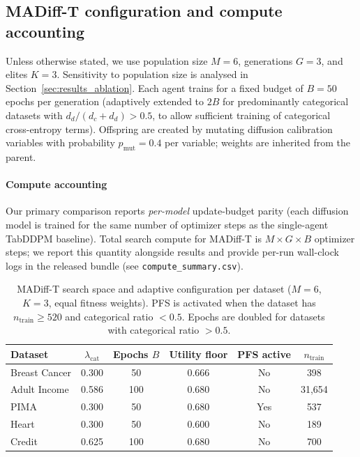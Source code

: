 \documentclass[preprint,12pt]{elsarticle}
\begin{document}
\subsection{MADiff-T configuration and compute accounting}
Unless otherwise stated, we use population size $M=6$, generations 
$G=3$, and elites $K=3$. Sensitivity to population size is 
analysed in Section~\ref{sec:results_ablation}. Each agent trains for a fixed budget of $B=50$ epochs per generation (adaptively extended to $2B$ for predominantly categorical datasets with $d_d/(d_c+d_d) > 0.5$, to allow sufficient training of categorical cross-entropy terms). Offspring are created by mutating diffusion calibration variables with probability $p_{\text{mut}}=0.4$ per variable; weights are inherited from the parent.

\paragraph{Compute accounting} Our primary comparison reports \emph{per-model} update-budget parity (each diffusion model is trained for the same number of optimizer steps as the single-agent TabDDPM baseline). Total search compute for MADiff-T is $M \times G \times B$ optimizer steps; we report this quantity alongside results and provide per-run wall-clock logs in the released bundle (see \texttt{compute\_summary.csv}).

\begin{table}[t]
\centering
\caption{MADiff-T search space and adaptive configuration per dataset ($M=6$, $K=3$, equal fitness weights). PFS is activated when the dataset has $n_{\text{train}} \geq 520$ and categorical ratio $< 0.5$. Epochs are doubled for datasets with categorical ratio $> 0.5$.}
\label{tab:madifft_hparams}
\scriptsize
\setlength{\tabcolsep}{4pt}
\renewcommand{\arraystretch}{1.1}
\begin{tabular}{l c c c c c}
\toprule
\rowcolor{tablehead}
\textbf{Dataset} & \textbf{$\lambda_{\text{cat}}$} & \textbf{Epochs $B$} & \textbf{Utility floor} & \textbf{PFS active} & \textbf{$n_{\text{train}}$} \\
\midrule
Breast Cancer & 0.300 & 50  & 0.666 & No  & 398 \\
Adult Income  & 0.586 & 100 & 0.680 & No  & 31{,}654 \\
PIMA          & 0.300 & 50  & 0.680 & Yes & 537 \\
Heart         & 0.300 & 50  & 0.600 & No  & 189 \\
Credit        & 0.625 & 100 & 0.680 & No  & 700 \\
\bottomrule
\end{tabular}
\end{table}
\end{document}
